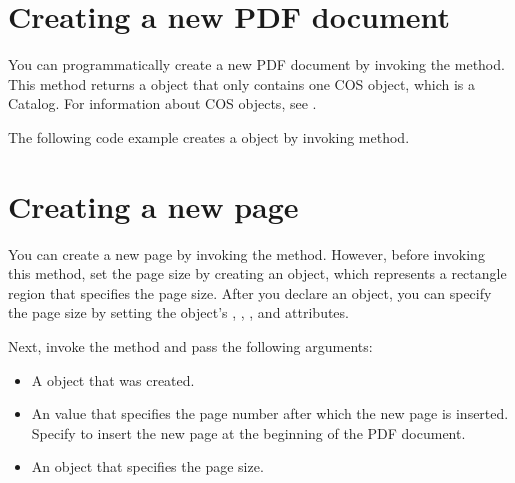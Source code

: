 \documentclass[letterpaper,12pt,english,openany,oneside]{sphinxmanual}
\begin{document}
\section{Creating a new PDF document}
\label{\detokenize{Plugins_Insertext:creating-a-new-pdf-document}}
You can programmatic\sphinxhyphen{}ally create a new PDF document by invoking the  method. This method returns a  object that only contains one COS object, which is a Catalog. For information about COS objects, see .

The following code example creates a  object by invoking  method.

\begin{sphinxVerbatim}[commandchars=\\\{\}]
  
  
\end{sphinxVerbatim}


\section{Creating a new page}
\label{\detokenize{Plugins_Insertext:creating-a-new-page}}
You can create a new page by invoking the  method. However, before invoking this method, set the page size by creating an  object, which represents a rectangle region that specifies the page size. After you declare an  object, you can specify the page size by setting the  object’s , , , and  attributes.

Next, invoke the  method and pass the following arguments:
\begin{itemize}
\item {} 
A  object that was created.

\item {} 
An  value that specifies the page number after which the new page is inserted. Specify  to insert the new page at the beginning of the PDF document.

\item {} 
An  object that specifies the page size.

\end{itemize}
\end{document}
